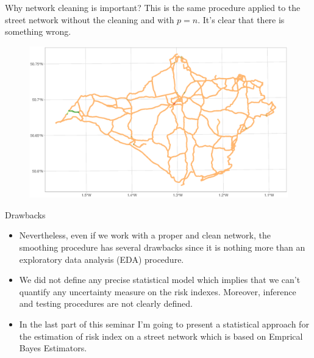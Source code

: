 \documentclass[c,10pt,pdftex]{beamer}
\begin{document}
\begin{frame}{Why network cleaning is important?}
\vspace{-0.25cm}
This is the same procedure applied to the street network without the cleaning and with $p = n$. It's clear that there is something wrong.
\begin{figure}
	\centering
	\includegraphics[width=\linewidth]{images/importance_of_network_cleaning}
\end{figure}
\end{frame}

\begin{frame}{Drawbacks}
\vspace{-0.75cm}
\begin{itemize}
	\setlength\itemsep{1em}
	\item Nevertheless, even if we work with a proper and clean network, the smoothing procedure has several drawbacks since it is nothing more than an exploratory data analysis (EDA) procedure. 
	
	\item We did not define any precise statistical model which implies that we can't quantify any uncertainty measure on the risk indexes. Moreover, inference and testing procedures are not clearly defined. 
	
	\item In the last part of this seminar I'm going to present a statistical approach for the estimation of risk index on a street network which is based on \alert{Emprical Bayes Estimators}. 	
\end{itemize}
\end{frame}
\end{document}
